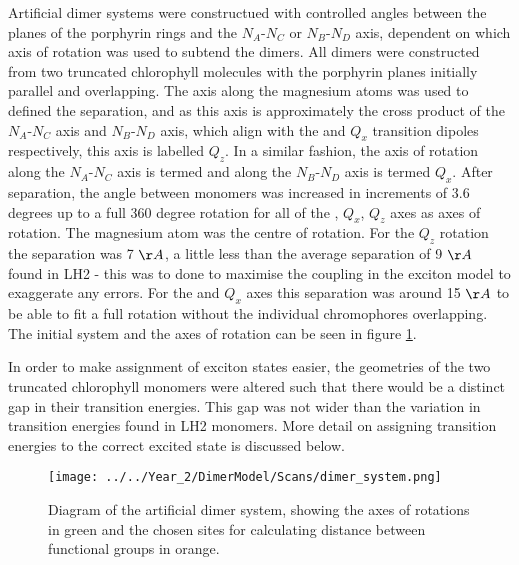 Artificial dimer systems were constructued with controlled angles between the planes
of the porphyrin rings and the $N_A$-$N_C$ or $N_B$-$N_D$ axis, dependent on which
axis of rotation was used to subtend the dimers. All dimers were constructed from
two truncated chlorophyll molecules with the porphyrin planes initially parallel
and overlapping. The axis along the magnesium atoms was used to defined the separation, 
and as this axis is approximately the cross product of the $N_A$-$N_C$ axis and $N_B$-$N_D$ axis,
which align with the \Qy and $Q_x$ transition dipoles respectively, this axis is labelled
$Q_z$. In a similar fashion, the axis of rotation along the $N_A$-$N_C$ axis is 
termed \Qy and along the $N_B$-$N_D$ axis is termed $Q_x$. After separation, the
angle between monomers was increased in increments of 3.6 degrees up to a full 360
degree rotation for all of the \Qy, $Q_x$, $Q_z$ axes as axes of rotation. The magnesium
atom was the centre of rotation. For the $Q_z$ rotation the separation was 7 $\AA{}$,
a little less than the average separation of 9 $\AA{}$ found in LH2 - this was to 
done to maximise the coupling in the exciton model to exaggerate any errors. For 
the \Qy and $Q_x$ axes this separation was around 15 $\AA{}$ to be able to fit a 
full rotation without the individual chromophores overlapping. The initial system
and the axes of rotation can be seen in figure \ref{fig:dimer_system}.

In order to make assignment of exciton states easier, the geometries of the two 
truncated chlorophyll monomers were altered such that there would be a distinct 
gap in their transition energies. This gap was not wider than the variation in 
transition energies found in LH2 monomers. More detail on assigning transition 
energies to the correct excited state is discussed below.

\begin{figure}
    \centering
    \texttt{[image: ../../Year\_2/DimerModel/Scans/dimer\_system.png]}
    \caption{Diagram of the artificial dimer system, showing the axes of rotations
    in green and the chosen sites for calculating distance between functional groups
    in orange.}
    \label{fig:dimer_system}
\end{figure}

